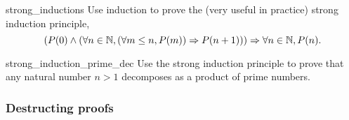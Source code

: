\begin{cex}{}{strong_inductions}
    Use induction to prove the (very useful in practice) strong induction principle,
    \begin{equation*}
        \left(P(0) \land (\forall n \in \mathbb{N}, (\forall m \le n, P(m)) \Rightarrow P(n+1)) \right) \Rightarrow \forall n \in \mathbb{N}, P(n).
    \end{equation*} 
\end{cex}
\begin{cex}{}{strong_induction_prime_dec}
    Use the strong induction principle to prove that any natural number \( n > 1 \) decomposes as a product of prime numbers.
\end{cex}

\subsubsection{Destructing proofs}

